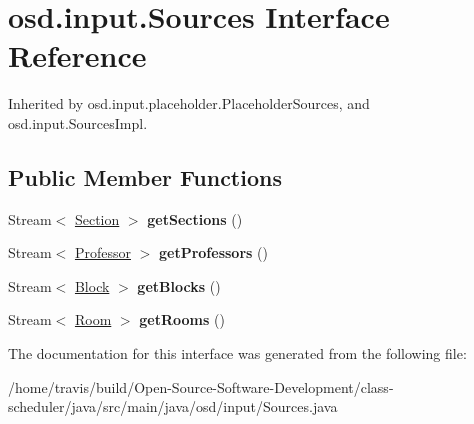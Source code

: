 \hypertarget{interfaceosd_1_1input_1_1_sources}{\section{osd.\-input.\-Sources Interface Reference}
\label{interfaceosd_1_1input_1_1_sources}
}


Inherited by osd.\-input.\-placeholder.\-Placeholder\-Sources, and osd.\-input.\-Sources\-Impl.

\subsection*{Public Member Functions}
\begin{DoxyCompactItemize}
\item 
\hypertarget{interfaceosd_1_1input_1_1_sources_ad46d381ede2382bdc3d575b8fecd2c57}{Stream$<$ \hyperlink{interfaceosd_1_1input_1_1_section}{Section} $>$ {\bfseries get\-Sections} ()}\label{interfaceosd_1_1input_1_1_sources_ad46d381ede2382bdc3d575b8fecd2c57}

\item 
\hypertarget{interfaceosd_1_1input_1_1_sources_ae844eaa01c01072d29b5bed2b38ce93d}{Stream$<$ \hyperlink{interfaceosd_1_1input_1_1_professor}{Professor} $>$ {\bfseries get\-Professors} ()}\label{interfaceosd_1_1input_1_1_sources_ae844eaa01c01072d29b5bed2b38ce93d}

\item 
\hypertarget{interfaceosd_1_1input_1_1_sources_abf5eae21254e2e3ed7a117a3c9fa985b}{Stream$<$ \hyperlink{interfaceosd_1_1input_1_1_block}{Block} $>$ {\bfseries get\-Blocks} ()}\label{interfaceosd_1_1input_1_1_sources_abf5eae21254e2e3ed7a117a3c9fa985b}

\item 
\hypertarget{interfaceosd_1_1input_1_1_sources_ab8ee51527f51a8aa6c3179c93ac7466c}{Stream$<$ \hyperlink{interfaceosd_1_1input_1_1_room}{Room} $>$ {\bfseries get\-Rooms} ()}\label{interfaceosd_1_1input_1_1_sources_ab8ee51527f51a8aa6c3179c93ac7466c}

\end{DoxyCompactItemize}


The documentation for this interface was generated from the following file\-:\begin{DoxyCompactItemize}
\item 
/home/travis/build/\-Open-\/\-Source-\/\-Software-\/\-Development/class-\/scheduler/java/src/main/java/osd/input/Sources.\-java\end{DoxyCompactItemize}
